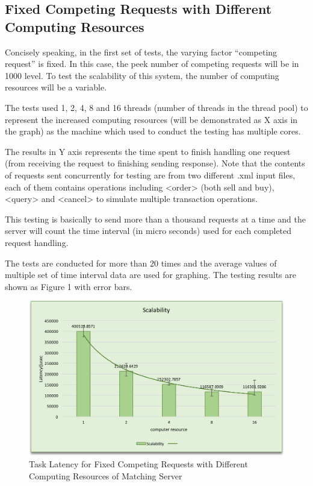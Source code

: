 \documentclass{article}
\begin{document}
\subsection{Fixed Competing Requests with Different Computing Resources}
Concisely speaking, in the first set of tests, the varying factor “competing request” is fixed. In this case, the peek number of competing requests will be in 1000 level. To test the scalability of this system, the number of computing resources will be a variable.\vspace{\baselineskip}

The tests used 1, 2, 4, 8 and 16 threads (number of threads in the thread pool) to represent the increased computing resources (will be demonstrated as X axis in the graph) as the machine which used to conduct the testing has multiple cores.\vspace{\baselineskip}

The results in Y axis represents the time spent to finish handling one request (from receiving the request to finishing sending response). Note that the contents of requests sent concurrently for testing are from two different .xml input files, each of them contains operations including <order> (both sell and buy), <query> and <cancel> to simulate multiple transaction operations.\vspace{\baselineskip}

This testing is basically to send more than a thousand requests at a time and the server will count the time interval (in micro seconds) used for each completed request handling.\vspace{\baselineskip}

The tests are conducted for more than 20 times and the average values of multiple set of time interval data are used for graphing. The testing results are shown as Figure 1 with error bars.


\begin{figure}[h!]
\centering
\includegraphics[scale=0.5]{ece5902.png}
\caption{Task Latency for Fixed Competing Requests with Different Computing Resources of Matching Server}
\label{fig:universe}
\end{figure}
\end{document}
